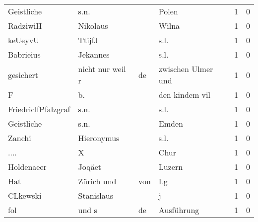 \begin{tabular}{llllrr}
               Geistliche &                               s.n. &             &                                       Polen &          1 &         0 \\
                 RadziwiH &                           Nikolaus &             &                                       Wilna &          1 &         0 \\
                  keUeyvU &                             TtijfJ &             &                                        s.l. &          1 &         0 \\
                Babrieius &                           Jekannes &             &                                        s.l. &          1 &         0 \\
                gesichert &                   nicht nur weil r &          de &                          zwischen Ulmer und &          1 &         0 \\
                        F &                                 b. &             &                              den kindem vil &          1 &         0 \\
      FriedriclfPfalzgraf &                               s.n. &             &                                        s.l. &          1 &         0 \\
               Geistliche &                               s.n. &             &                                       Emden &          1 &         0 \\
                   Zanchi &                         Hieronymus &             &                                        s.l. &          1 &         0 \\
                     .... &                                  X &             &                                        Chur &          1 &         0 \\
               Holdenaeer &                             Joqäet &             &                                      Luzern &          1 &         0 \\
                      Hat &                         Zürich und &         von &                                          Lg &          1 &         0 \\
                 CLkewski &                         Stanislaus &             &                                           j &          1 &         0 \\
                      fol &                              und s &          de &                                  Ausführung &          1 &         0 \\

\end{tabular}
